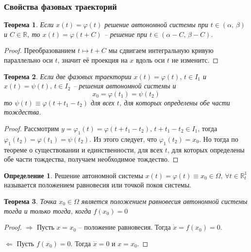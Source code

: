 \documentclass[a4paper,12pt]{article}
\renewcommand{\phi}{\ensuremath{\varphi}}
\theoremstyle{plain}
\newtheorem{theorem}{Теорема}[section]
\theoremstyle{definition}
\newtheorem{definition}{Определение}[section]
\theoremstyle{remark}
\begin{document}
\subsubsection*{Свойства фазовых траекторий}
\begin{theorem}
	Если $x(t) = \phi(t)$ решение автономной системы при $t \in (\alpha,\,\beta)$ и $C \in \mathbb{R}$, то $x(t) = \phi(t + C)$ -- решение при $t \in (\alpha - C,\, \beta - C)$.
\end{theorem}

\begin{proof}
	Преобразованием $t \mapsto t + C$ мы сдвигаем интегральную кривую параллельно оси $t$, значит её проекция на $x$ вдоль оси $t$ не изменитс.
\end{proof}

\begin{theorem}
	Если две фазовых траектории $x(t) = \phi(t),\, t \in I_1$ и $x(t) = \psi(t),\, t \in I_2$ -- решения автономной системы и
	\[x_0 = \phi(t_1) = \psi(t_2)\]
	то $\psi(t) \equiv \phi(t + t_1 - t_2)$ для всех $t$, для которых определены обе части тождества.
\end{theorem}

\begin{proof}
	Рассмотрим $y = \phi_1(t) = \phi(t + t_1 - t_2),\, t + t_1 - t_2 \in I_1$, тогда $\phi_1(t_2) = \phi(t_1) = \psi(t_2)$. Из этого следует, что $\phi_1(t_2) = x_0$. Но тогда по теореме о существовании и единственности, для всех $t$, для которых определены обе части тождества, получаем необходимое тождество.
\end{proof}

\begin{definition}
	Решение автономной системы $x(t) = \phi(t) \equiv x_0 \in \Omega,\, \forall t \in \mathbb{R}^1_t$ называется положением равновесия или точкой покоя системы.
\end{definition}

\begin{theorem}
	Точка $x_0 \in \Omega$ является положением равновесия автономной системы тогда и только тогда, когда $f(x_0) = 0$
\end{theorem}

\begin{proof}
	$\Rightarrow$ Пусть $x = x_0$ -- положение равновесия. Тогда $\dot{x} = f(x_0) = 0$.

	$\Leftarrow$ Пусть $f(x_0) = 0$. Тогда $\dot{x} = 0$ и $x = x_0$.
\end{proof}
\end{document}
